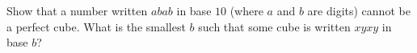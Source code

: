 Show that a number written $abab$ in base $10$ (where $a$ and $b$ are digits) cannot be a perfect cube. What is the smallest $b$ such that some cube is written $xyxy$ in base $b$?
